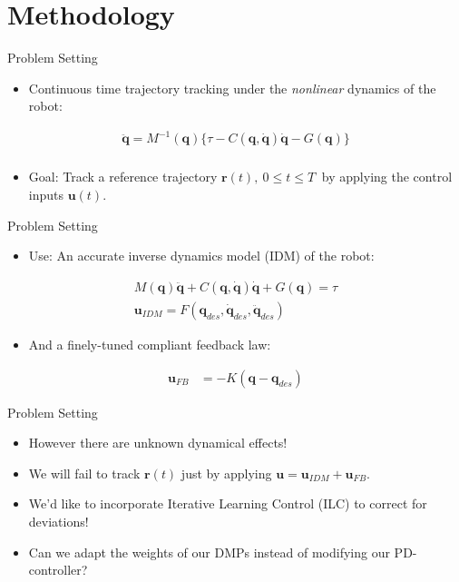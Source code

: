 \documentclass[handout]{beamer}
\newcommand{\joint}{\mathbf{q}} %
\newcommand{\traj}{\mathbf{r}} %
\newcommand{\sysInput}{\mathbf{u}} %
\begin{document}
\section{Methodology}
%
\begin{frame}{Problem Setting}
\begin{itemize}
\item Continuous time trajectory tracking under the \emph{nonlinear} dynamics of the robot: \pause
\end{itemize}
\begin{equation*}
\begin{aligned}
\ddot{\joint} = M^{-1}(\joint)\{ \tau - C(\joint,\dot{\joint})\dot{\joint} - G(\joint) \}\\
\end{aligned}
\end{equation*}
\begin{itemize}
\item Goal: Track a reference trajectory $\traj(t), \ 0 \leq t \leq T \ $ by applying the control inputs $\sysInput(t)$. \pause
\end{itemize}
\end{frame}
%
\begin{frame}{Problem Setting}
\begin{itemize}
\item Use: An accurate inverse dynamics model (IDM) of the robot: \pause
\end{itemize}
\begin{equation*}
\begin{aligned}
M(\joint)\ddot{\joint} + C(\joint,\dot{\joint})\dot{\joint} + G(\joint) = \tau \\
\sysInput_{IDM} = F(\joint_{des},\dot{\joint}_{des},\ddot{\joint}_{des})
\end{aligned}
\end{equation*}
\pause 
\begin{itemize}
\item And a finely-tuned compliant feedback law: \pause
\end{itemize}
\begin{equation*}
\begin{aligned}
\sysInput_{FB} &= -K(\joint - \joint_{des})
\end{aligned}
\end{equation*}
\end{frame}
%
\begin{frame}{Problem Setting}
\begin{itemize}	
\item However there are unknown dynamical effects! \pause
\item We will fail to track $\traj(t)$ just by applying $\sysInput = \sysInput_{IDM} + \sysInput_{FB}$. \pause
\item We'd like to incorporate Iterative Learning Control (ILC) to correct for deviations! \pause
\item Can we adapt the weights of our DMPs instead of modifying our PD-controller?
\end{itemize}
\end{frame}
\end{document}
